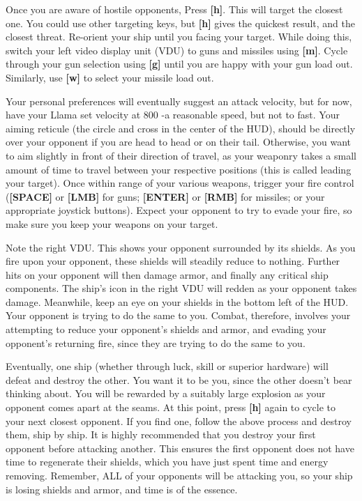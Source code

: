 \documentclass{article}
\begin{document}
Once you are aware of hostile opponents, Press \textbf{[h]}. This will target the closest one. You could use other targeting keys, but \textbf{[h] }gives the quickest result, and the closest threat. Re-orient your ship until you facing your target. While doing this, switch your left video display unit (VDU) to guns and missiles using \textbf{[m]}. Cycle through your gun selection using \textbf{[g] }until you are happy with your gun load out. Similarly, use \textbf{[w] }to select your missile load out. 

Your personal preferences will eventually suggest an attack velocity, but for now, have your Llama set velocity at 800 -a reasonable speed, but not to fast. Your aiming reticule (the circle and cross in the center of the HUD), should be directly over your opponent if you are head to head or on their tail. Otherwise, you want to aim slightly in front of their direction of travel, as your weaponry takes a small amount of time to travel between your respective positions (this is called leading your target). Once within range of your various weapons, trigger your fire control (\textbf{[SPACE] }or \textbf{[LMB] }for guns; \textbf{[ENTER] }or \textbf{[RMB] }for missiles; or your appropriate joystick buttons). Expect your opponent to try to evade your fire, so make sure you keep your weapons on your target. 



Note the right VDU. This shows your opponent surrounded by its shields. As you fire upon your opponent, these shields will steadily reduce to nothing. Further hits on your opponent will then damage armor, and finally any critical ship components. The ship's icon in the right VDU will redden as your opponent takes damage. Meanwhile, keep an eye on your shields in the bottom left of the HUD. Your opponent is trying to do the same to you. Combat, therefore, involves your attempting to reduce your opponent's shields and armor, and evading your opponent's returning fire, since they are trying to do the same to you. 

Eventually, one ship (whether through luck, skill or superior hardware) will defeat and destroy the other. You want it to be you, since the other doesn't bear thinking about. You will be rewarded by a suitably large explosion as your opponent comes apart at the seams. At this point, press \textbf{[h] }again to cycle to your next closest opponent. If you find one, follow the above process and destroy them, ship by ship. It is highly recommended that you destroy your first opponent before attacking another. This ensures the first opponent does not have time to regenerate their shields, which you have just spent time and energy removing. Remember, ALL of your opponents will be attacking you, so your ship is losing shields and armor, and time is of the essence. 
\end{document}

